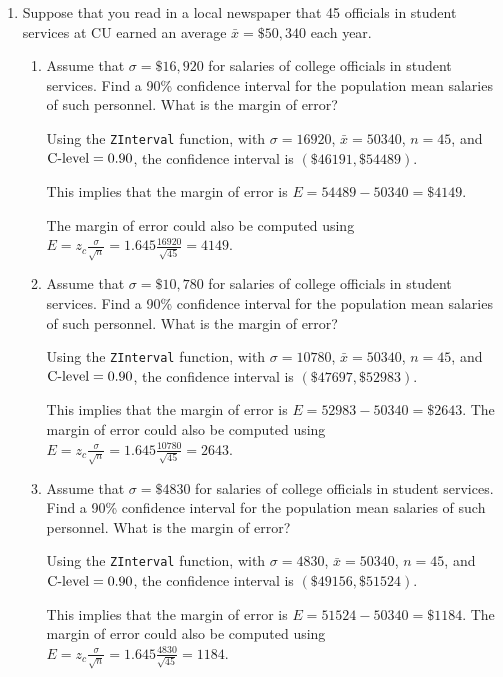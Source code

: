 \begin{enumerate}
	
\item Suppose that you read in a local newspaper that 45 officials in student services at CU earned an average $\bar x = \$50,340$ each year.

	\begin{enumerate}
	\item Assume that $\sigma = \$16,920$ for salaries of college officials in student services. Find a 90\% confidence interval for the population mean salaries of such personnel. What is the margin of error? 
	
	{\answer Using the \texttt{ZInterval} function, with $\sigma = 16920$, $\bar{x} = 50340$, $n=45$, and $\textnormal{C-level} = 0.90$, the confidence interval is $(\$46191, \$54489)$. 
	
	This implies that the margin of error is $E = 54489 - 50340 = \$4149$. 
	
	The margin of error could also be computed using $\displaystyle E = z_c\frac{\sigma}{\sqrt{n}} = 1.645\frac{16920}{\sqrt{45}} = 4149$.
	} 

	\item Assume that $\sigma = \$10,780$ for salaries of college officials in student services. Find a 90\% confidence interval for the population mean salaries of such personnel. What is the margin of error? 
	
	{\answer Using the \texttt{ZInterval} function, with $\sigma = 10780$, $\bar{x} = 50340$, $n=45$, and $\textnormal{C-level} = 0.90$, the confidence interval is $(\$47697, \$52983)$. 
	
	This implies that the margin of error is $E = 52983 - 50340 = \$2643$. 
	The margin of error could also be computed using $\displaystyle E = z_c\frac{\sigma}{\sqrt{n}} = 1.645\frac{10780}{\sqrt{45}} = 2643$.
	} 

	\item Assume that $\sigma = \$4830$ for salaries of college officials in student services. Find a 90\% confidence interval for the population mean salaries of such personnel. What is the margin of error? 
	
	{\answer Using the \texttt{ZInterval} function, with $\sigma = 4830$, $\bar{x} = 50340$, $n=45$, and $\textnormal{C-level} = 0.90$, the confidence interval is $(\$49156, \$51524)$. 
	
	This implies that the margin of error is $E = 51524 - 50340 = \$1184$. 
	The margin of error could also be computed using $\displaystyle E = z_c\frac{\sigma}{\sqrt{n}} = 1.645\frac{4830}{\sqrt{45}} = 1184$.
	} 


\end{enumerate}
\end{enumerate}
